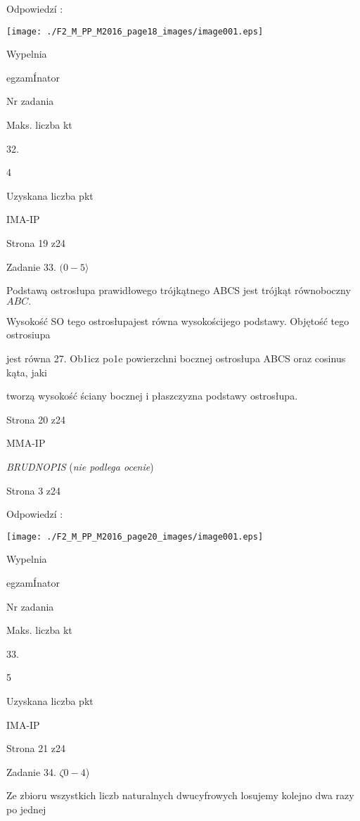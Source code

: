 \documentclass[a4paper,12pt]{article}
\begin{document}
Odpowiedzí :
\begin{center}
\texttt{[image: ./F2\_M\_PP\_M2016\_page18\_images/image001.eps]}
\end{center}
Wypelnia

egzamÍnator

Nr zadania

Maks. liczba kt

32.

4

Uzyskana liczba pkt

IMA-IP

Strona 19 z24





Zadanie 33. $(0-5\rangle$

Podstawą ostrosłupa prawidłowego trójkątnego ABCS jest trójkąt równoboczny $ABC.$

Wysokość SO tego ostrosłupajest równa wysokościjego podstawy. Objętość tego ostrosiupa

jest równa 27. Ob1icz po1e powierzchni bocznej ostrosłupa ABCS oraz cosinus kąta, jaki

tworzą wysokość ściany bocznej i płaszczyzna podstawy ostrosłupa.

Strona 20 z24

MMA-IP





{\it BRUDNOPIS} ({\it nie podlega ocenie})

Strona 3 z24





Odpowiedzí :
\begin{center}
\texttt{[image: ./F2\_M\_PP\_M2016\_page20\_images/image001.eps]}
\end{center}
Wypelnia

egzamÍnator

Nr zadania

Maks. liczba kt

33.

5

Uzyskana liczba pkt

IMA-IP

Strona 21 z24





Zadanie 34. $\zeta 0-4$)

Ze zbioru wszystkich liczb naturalnych dwucyfrowych losujemy kolejno dwa razy po jednej
\end{document}
